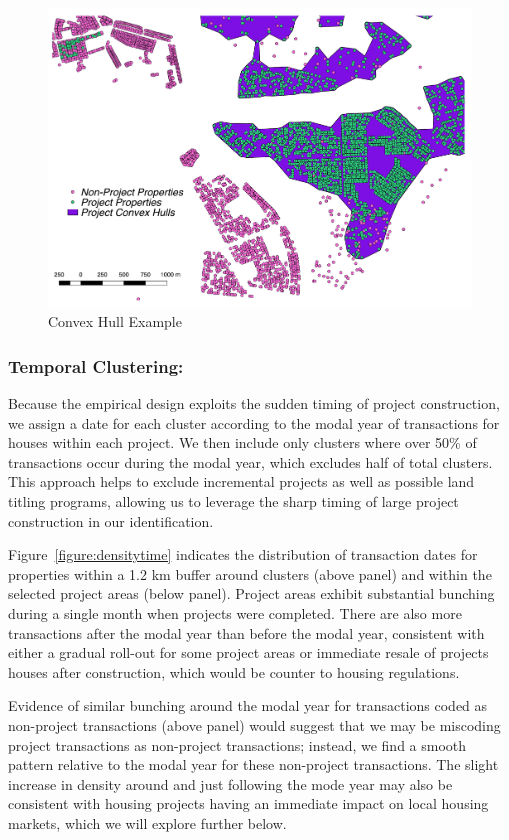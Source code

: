 \documentclass[12pt]{article}
\begin{document}
\begin{figure}
\caption{Convex Hull Example}\label{figure:conhull}
\centering
\includegraphics[scale=.5]{figures/convex_hull_v3_test.pdf}
\end{figure}

\subsubsection{Temporal Clustering:}  Because the empirical design exploits the sudden timing of project construction, we assign a date for each cluster according to the modal year of transactions for houses within each project.  We then include only clusters where over 50\% of transactions occur during the modal year, which excludes half of total clusters.  This approach helps to exclude incremental projects as well as possible land titling programs, allowing us to leverage the sharp timing of large project construction in our identification.  

Figure~\ref{figure:densitytime} indicates the distribution of transaction dates for properties within a 1.2 km buffer around clusters (above panel) and within the selected project areas (below panel).  Project areas exhibit substantial bunching during a single month when projects were completed.  There are also more transactions after the modal year than before the modal year, consistent with either a gradual roll-out for some project areas or immediate resale of projects houses after construction, which would be counter to housing regulations.  

Evidence of similar bunching around the modal year for transactions coded as non-project transactions (above panel) would suggest that we may be miscoding project transactions as non-project transactions; instead, we find a smooth pattern relative to the modal year for these non-project transactions.  The slight increase in density around and just following the mode year may also be consistent with housing projects having an immediate impact on local housing markets, which we will explore further below.
\end{document}
